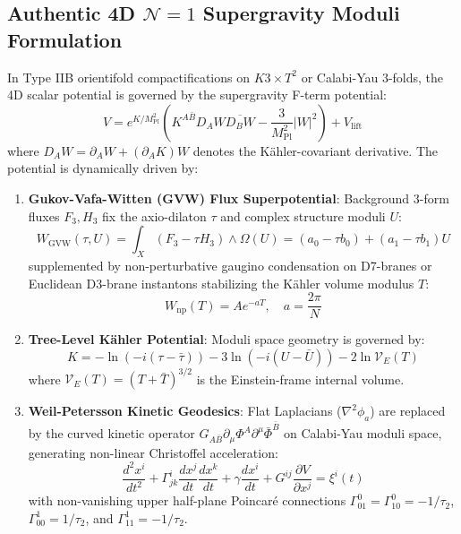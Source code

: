 \documentclass[11pt,a4paper]{article}
\begin{document}
\subsection{Authentic 4D \texorpdfstring{$\mathcal{N}=1$}{N=1} Supergravity Moduli Formulation}
In Type IIB orientifold compactifications on $K3 \times T^2$ or Calabi-Yau 3-folds, the 4D scalar potential is governed by the supergravity F-term potential:
\begin{equation}
\label{eq:sugra_potential}
V = e^{K / M_{\text{Pl}}^2} \left( K^{A\bar{B}} D_A W \overline{D_B W} - \frac{3}{M_{\text{Pl}}^2} |W|^2 \right) + V_{\text{lift}}
\end{equation}
where $D_A W = \partial_A W + (\partial_A K) W$ denotes the K\"ahler-covariant derivative. The potential is dynamically driven by:
\begin{enumerate}
    \item \textbf{Gukov-Vafa-Witten (GVW) Flux Superpotential}: Background 3-form fluxes $F_3, H_3$ fix the axio-dilaton $\tau$ and complex structure moduli $U$:
    \begin{equation}
    W_{\text{GVW}}(\tau, U) = \int_{X} (F_3 - \tau H_3) \wedge \Omega(U) = (a_0 - \tau b_0) + (a_1 - \tau b_1) U
    \end{equation}
    supplemented by non-perturbative gaugino condensation on D7-branes or Euclidean D3-brane instantons stabilizing the K\"ahler volume modulus $T$:
    \begin{equation}
    W_{\text{np}}(T) = A e^{-a T}, \quad a = \frac{2\pi}{N}
    \end{equation}
    
    \item \textbf{Tree-Level K\"ahler Potential}: Moduli space geometry is governed by:
    \begin{equation}
    K = -\ln\left(-i(\tau - \bar{\tau})\right) - 3\ln\left(-i(U - \bar{U})\right) - 2\ln \mathcal{V}_E(T)
    \end{equation}
    where $\mathcal{V}_E(T) = (T + \bar{T})^{3/2}$ is the Einstein-frame internal volume.
    
    \item \textbf{Weil-Petersson Kinetic Geodesics}: Flat Laplacians ($\nabla^2 \phi_a$) are replaced by the curved kinetic operator $G_{A\bar{B}} \partial_\mu \Phi^A \partial^\mu \bar{\Phi}^{\bar{B}}$ on Calabi-Yau moduli space, generating non-linear Christoffel acceleration:
    \begin{equation}
    \frac{d^2 x^i}{dt^2} + \Gamma^i_{jk} \frac{dx^j}{dt} \frac{dx^k}{dt} + \gamma \frac{dx^i}{dt} + G^{ij} \frac{\partial V}{\partial x^j} = \xi^i(t)
    \end{equation}
    with non-vanishing upper half-plane Poincar\'e connections $\Gamma^0_{01} = \Gamma^0_{10} = -1/\tau_2$, $\Gamma^1_{00} = 1/\tau_2$, and $\Gamma^1_{11} = -1/\tau_2$.
\end{enumerate}
\end{document}
